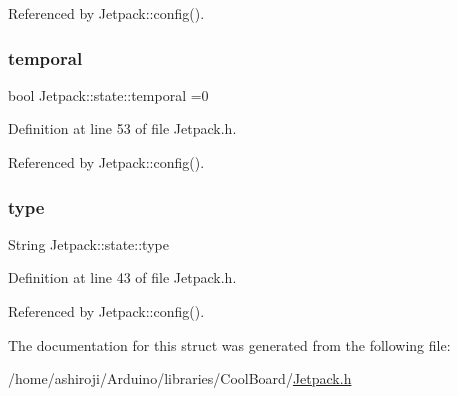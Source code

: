 Referenced by Jetpack\+::config().

\mbox{\label{structJetpack_1_1state_abd6039e7a48856550b0ffbf8bcff7bdd}} 
\subsubsection{\texorpdfstring{temporal}{temporal}}
{\footnotesize\ttfamily bool Jetpack\+::state\+::temporal =0}



Definition at line 53 of file Jetpack.\+h.



Referenced by Jetpack\+::config().

\mbox{\label{structJetpack_1_1state_a9143580871c2e573fb502bb94c1da8e5}} 
\subsubsection{\texorpdfstring{type}{type}}
{\footnotesize\ttfamily String Jetpack\+::state\+::type}



Definition at line 43 of file Jetpack.\+h.



Referenced by Jetpack\+::config().



The documentation for this struct was generated from the following file\+:\begin{DoxyCompactItemize}
\item 
/home/ashiroji/\+Arduino/libraries/\+Cool\+Board/\hyperlink{Jetpack_8h}{Jetpack.\+h}\end{DoxyCompactItemize}

